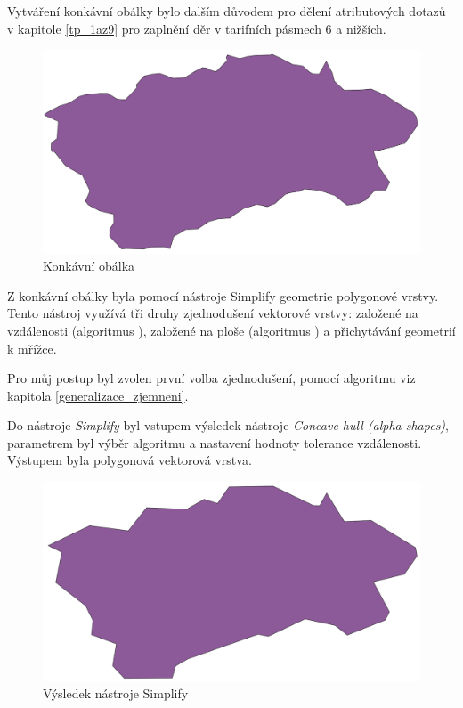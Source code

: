 Vytváření konkávní obálky bylo dalším důvodem pro dělení atributových dotazů v kapitole \ref{tp_1az9} pro 
zaplnění děr v tarifních pásmech 6 a nižších.  

\begin{figure}[H] \centering
    \includegraphics[width=400pt]{./pictures/concaveHull-P0B.png}
    \caption[Konkávní obálka]{Konkávní obálka}
	\label{fig:concaveHull-P0B}              
\end{figure} 

Z konkávní obálky byla pomocí nástroje Simplify  geometrie polygonové vrstvy. Tento nástroj
využívá tři druhy zjednodušení vektorové vrstvy: založené na vzdálenosti (algoritmus ),
založené na ploše (algoritmus ) a přichytávání geometrií k mřížce.

Pro můj postup byl zvolen první volba zjednodušení, pomocí algoritmu  viz kapitola \ref{generalizace_zjemneni}.


Do nástroje \textit{Simplify} byl vstupem výsledek nástroje \textit{Concave hull (alpha shapes)}, parametrem byl výběr algoritmu 
a nastavení hodnoty tolerance vzdálenosti. Výstupem byla polygonová vektorová vrstva.

\begin{figure}[H] \centering
    \includegraphics[width=400pt]{./pictures/simplify-P0B.png}
    \caption[Výsledek nástroje Simplify]{Výsledek nástroje Simplify}
	\label{fig:simplify-P0B}                                
\end{figure}

